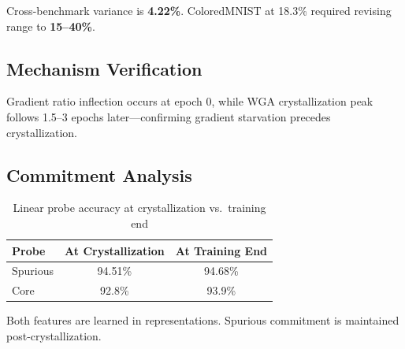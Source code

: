 Cross-benchmark variance is \textbf{4.22\%}. ColoredMNIST at 18.3\% required revising range to \textbf{15--40\%}.

\subsection{Mechanism Verification}

Gradient ratio inflection occurs at epoch 0, while WGA crystallization peak follows 1.5--3 epochs later---confirming gradient starvation precedes crystallization.

\subsection{Commitment Analysis}

\begin{table}[h]
\centering
\caption{Linear probe accuracy at crystallization vs.\ training end}
\begin{tabular}{lcc}
\toprule
Probe & At Crystallization & At Training End \\
\midrule
Spurious & 94.51\% & 94.68\% \\
Core & 92.8\% & 93.9\% \\
\bottomrule
\end{tabular}
\label{tab:probes}
\end{table}

Both features are learned in representations. Spurious commitment is maintained post-crystallization.
